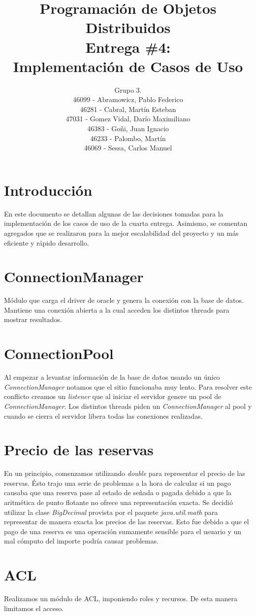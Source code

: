 \documentclass[a4paper,11pt]{article}
\title{
        Programación de Objetos Distribuidos \\
        Entrega \#4: \\
        Implementación de Casos de Uso
    }
\author{
        Grupo 3. \\
        46099 - Abramowicz, Pablo Federico \\
        46281 - Cabral, Martín Esteban \\
        47031 - Gomez Vidal, Darío Maximiliano \\
        46383 - Goñi, Juan Ignacio \\
        46233 - Palombo, Martín \\
        46069 - Sessa, Carlos Manuel
        }
\date{}
\begin{document}
\maketitle
\pagebreak

\section{Introducción}
En este documento se detallan algunas de las decisiones tomadas para la 
implementación de los casos de uso de la cuarta entrega.
Asimismo, se comentan agregados que se realizaron para la mejor
escalabilidad del proyecto y un más eficiente y rápido desarrollo.

\section{ConnectionManager}
Módulo que carga el driver de oracle y genera la conexión con la base de datos.
Mantiene una conexión abierta a la cual acceden los distintos threads para
mostrar resultados.

\section{ConnectionPool}
Al empezar a levantar información de la base de datos usando un único
\textit{ConnectionManager} notamos que el sitio funcionaba muy lento.
Para resolver este conflicto creamos un \textit{listener} que al iniciar el
servidor genere un pool de \textit{ConnectionManager}. Los distintos threads
piden un \textit{ConnectionManager} al pool y cuando se cierra el servidor
libera todas las conexiones realizadas.

\section{Precio de las reservas}
En un principio, comenzamos utilizando \textit{double} para representar
el precio de las reservas. Ésto trajo una serie de problemas a la hora de
calcular si un pago causaba que una reserva pase al estado de señada o
pagada debido a que la aritmética de punto flotante no ofrece una
representación exacta. Se decidió utilizar la clase \textit{BigDecimal} provista
por el paquete \textit{java.util.math} para representar de manera exacta los
precios de las reservas. Esto fue debido a que el pago de una reserva es
una operación sumamente sensible para el usuario y un mal cómputo del
importe podría causar problemas.

\section{ACL}
Realizamos un módulo de ACL, imponiendo roles y recursos.
De esta manera limitamos el acceso.
\end{document}
